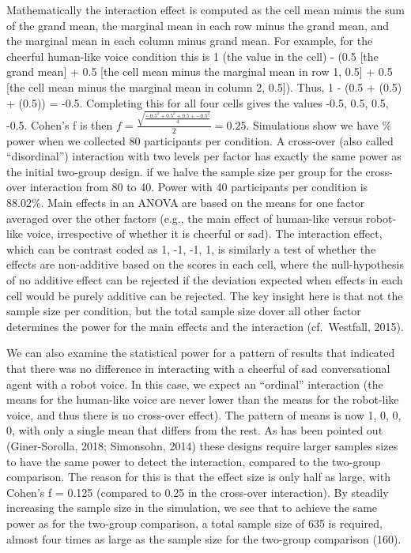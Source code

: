 \documentclass[,jou, draftfirst, a4paper,floatsintext]{apa6}
\begin{document}
Mathematically the interaction effect is computed as the cell mean minus the sum of the grand mean, the marginal mean in each row minus the grand mean, and the marginal mean in each column minus grand mean. For example, for the cheerful human-like voice condition this is 1 (the value in the cell) - (0.5 {[}the grand mean{]} + 0.5 {[}the cell mean minus the marginal mean in row 1, 0.5{]} + 0.5 {[}the cell mean minus the marginal mean in column 2, 0.5{]}).
Thus, 1 - (0.5 + (0.5) + (0.5)) = -0.5.
Completing this for all four cells gives the values -0.5, 0.5, 0.5, -0.5.
Cohen's f is then \(f = \frac { \sqrt { \frac { -0.5^2 + 0.5^2 + 0.5 + -0.5^2 } { 4 } }}{ 2 } = 0.25\).
Simulations show we have \% power when we collected 80 participants per condition.
A cross-over (also called \enquote{disordinal}) interaction with two levels per factor has exactly the same power as the initial two-group design. if we halve the sample size per group for the cross-over interaction from 80 to 40.
Power with 40 participants per condition is 88.02\%.
Main effects in an ANOVA are based on the means for one factor averaged over the other factors (e.g., the main effect of human-like versus robot-like voice, irrespective of whether it is cheerful or sad).
The interaction effect, which can be contrast coded as 1, -1, -1, 1, is similarly a test of whether the effects are non-additive based on the scores in each cell, where the null-hypothesis of no additive effect can be rejected if the deviation expected when effects in each cell would be purely additive can be rejected.
The key insight here is that not the sample size per condition, but the total sample size dover all other factor determines the power for the main effects and the interaction (cf.~Westfall, 2015).

We can also examine the statistical power for a pattern of results that indicated that there was no difference in interacting with a cheerful of sad conversational agent with a robot voice.
In this case, we expect an \enquote{ordinal} interaction (the means for the human-like voice are never lower than the means for the robot-like voice, and thus there is no cross-over effect). The pattern of means is now 1, 0, 0, 0, with only a single mean that differs from the rest.
As has been pointed out (Giner-Sorolla, 2018; Simonsohn, 2014) these designs require larger samples sizes to have the same power to detect the interaction, compared to the two-group comparison.
The reason for this is that the effect size is only half as large, with Cohen's f = 0.125 (compared to 0.25 in the cross-over interaction).
By steadily increasing the sample size in the simulation, we see that to achieve the same power as for the two-group comparison, a total sample size of 635 is required, almost four times as large as the sample size for the two-group comparison (160).
\end{document}
